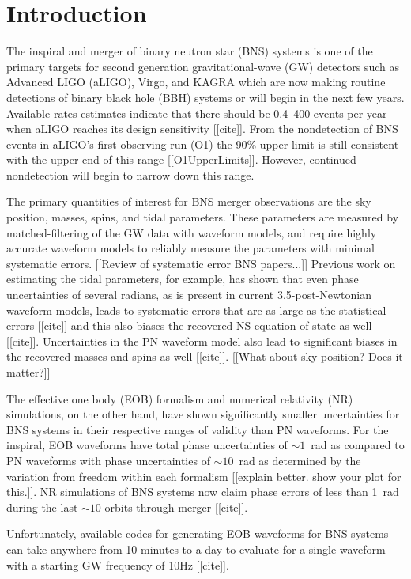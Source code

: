 \documentclass[prd,aps,letter,twocolumn,floatfix,notitlepage]{revtex4-1}
\begin{document}
\section{Introduction}

The inspiral and merger of binary neutron star (BNS) systems is one of the primary targets for second generation gravitational-wave (GW) detectors such as Advanced LIGO (aLIGO), Virgo, and KAGRA which are now making routine detections of binary black hole (BBH) systems or will begin in the next few years. Available rates estimates indicate that there should be 0.4--400 events per year when aLIGO reaches its design sensitivity [[cite]]. From the nondetection of BNS events in aLIGO's first observing run (O1) the 90\% upper limit is still consistent with the upper end of this range [[O1UpperLimits]]. However, continued nondetection will begin to narrow down this range.

The primary quantities of interest for BNS merger observations are the sky position, masses, spins, and tidal parameters. These parameters are measured by matched-filtering of the GW data with waveform models, and require highly accurate waveform models to reliably measure the parameters with minimal systematic errors. [[Review of systematic error BNS papers...]] Previous work on estimating the tidal parameters, for example, has shown that even phase uncertainties of several radians, as is present in current 3.5-post-Newtonian waveform models, leads to systematic errors that are as large as the statistical errors [[cite]] and this also biases the recovered NS equation of state as well [[cite]]. Uncertainties in the PN waveform model also lead to significant biases in the recovered masses and spins as well [[cite]]. [[What about sky position? Does it matter?]]

The effective one body (EOB) formalism and numerical relativity (NR) simulations, on the other hand, have shown significantly smaller uncertainties for BNS systems in their respective ranges of validity than PN waveforms. For the inspiral, EOB waveforms have total phase uncertainties of $\sim 1$~rad as compared to PN waveforms with phase uncertainties of $\sim 10$~rad as determined by the variation from freedom within each formalism [[explain better. show your plot for this.]]. NR simulations of BNS systems now claim phase errors of less than 1~rad during the last $\sim 10$ orbits through merger [[cite]]. 

Unfortunately, available codes for generating EOB waveforms for BNS systems can take anywhere from 10 minutes to a day to evaluate for a single waveform with a starting GW frequency of 10Hz [[cite]].  
\end{document}
